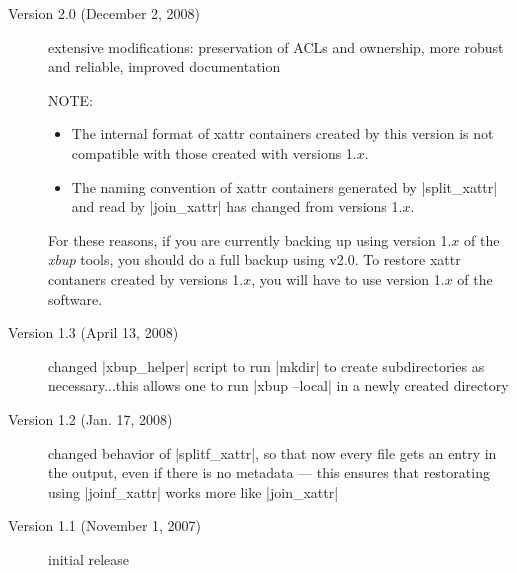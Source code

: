 \documentclass[11pt]{article}
\begin{document}
\begin{description}
\item[Version 2.0 (December 2, 2008)]
extensive modifications: preservation of ACLs and ownership,
more robust and reliable,
improved documentation

NOTE:
\begin{itemize}
\item
The internal format of 
xattr containers created by this version is not compatible
with those created with versions 1.$x$. 

\item
The naming convention of xattr containers generated by |split_xattr|
and read by |join_xattr| has changed from versions 1.$x$.
\end{itemize}
For these reasons, if you are currently backing up using
version 1.$x$ of the \emph{xbup} tools,
you should do a full backup using v2.0.
To restore xattr contaners created by versions 1.$x$,
you will have to use version 1.$x$ of the software.



\item[Version 1.3 (April 13, 2008)]
changed |xbup_helper| script to run |mkdir| to create subdirectories
    as necessary...this allows one to run |xbup --local| in a 
    newly created directory

\item[Version 1.2 (Jan. 17, 2008)]
 changed behavior of |splitf_xattr|, so that now
    every file gets an entry in the output, even if there
    is no metadata --- this ensures that restorating using
    |joinf_xattr| works more like |join_xattr|


\item[Version 1.1 (November 1, 2007)]
initial release


\end{description}
\end{document}
